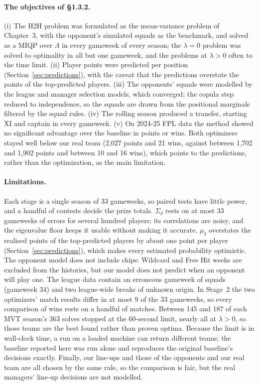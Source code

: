 \documentclass[12pt,oneside,a4paper]{book}
\theoremstyle{definition}
\theoremstyle{remark}
\begin{document}
	\paragraph{The objectives of §1.3.2.} (i) The H2H problem was formulated as the mean-variance
	problem of Chapter~3, with the opponent's simulated squads as the benchmark, and solved as a
	MIQP over $\Lambda$ in every gameweek of every season; the $\lambda=0$ problem was solved to
	optimality in all but one gameweek, and the problems at $\lambda>0$ often to the time limit.
	(ii) Player points were predicted per position (Section~\ref{sec:predictions}), with the
	caveat that the predictions overstate the points of the top-predicted players. (iii) The
	opponents' squads were modelled by the league and manager selection models, which converged;
	the copula step reduced to independence, so the squads are drawn from the positional
	marginals filtered by the squad rules. (iv) The rolling season produced a transfer, starting
	XI and captain in every gameweek. (v) On 2024-25 FPL data the method showed no significant
	advantage over the baseline in points or wins. Both optimizers stayed well below our real
	team (2{,}027 points and 21 wins, against between 1{,}702 and 1{,}902 points and between 10 and
	16 wins), which points to the predictions, rather than the optimization, as the main
	limitation.

	\paragraph{Limitations.} Each stage is a single season of 33 gameweeks, so paired tests have
	little power, and a handful of contests decide the prize totals. $\Sigma_\delta$ rests on at
	most 33 gameweeks of errors for several hundred players; its correlations are noisy, and the
	eigenvalue floor keeps it usable without making it accurate. $\mu_\delta$ overstates the
	realised points of the top-predicted players by about one point per player
	(Section~\ref{sec:predictions}), which makes every estimated probability optimistic. The
	opponent model does not include chips: Wildcard and Free Hit weeks are excluded from the
	histories, but our model does not predict when an opponent will play one. The league data
	contain an erroneous gameweek of squads (gameweek 34) and two league-wide breaks of unknown
	origin. In Stage~2 the two optimizers' match results differ in at most 9 of the 33 gameweeks,
	so every comparison of wins rests on a handful of matches. Between 145 and 187 of each MVT
	season's 363 solves stopped at the 60-second limit, nearly all at $\lambda>0$, so those teams
	are the best found rather than proven optima. Because the limit is in wall-clock time, a run on a loaded machine can return
	different teams; the baseline reported here was run alone and reproduces the original
	baseline's decisions exactly. Finally, our line-ups and those of the opponents and our real
	team are all chosen by the same rule, so the comparison is fair, but the real managers'
	line-up decisions are not modelled.
\end{document}
